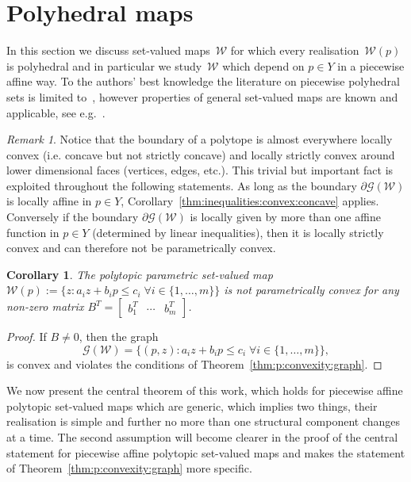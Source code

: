 \documentclass[final]{elsarticle}
\newcounter{thmcount}
\newtheorem{cor}[thmcount]{Corollary}
\theoremstyle{remark}
\newtheorem{rem}[thmcount]{Remark}
\theoremstyle{definition}
\begin{document}
\section{Polyhedral maps}\label{sec:polyhedral:maps}
%
%
%
%
In this section we discuss set-valued maps~$\mathcal W$ for which every realisation~$\mathcal W(p)$ is polyhedral and in particular we study~$\mathcal W$ which depend on $p\in Y$ in a piecewise affine way. 
%
To the authors' best knowledge the literature on piecewise polyhedral sets is limited to~\cite{Finzel:2000}, however properties of general set-valued maps are known and applicable, see e.g.~\cite{Aubin:2009}.
%
\begin{rem}
%
Notice that the boundary of a polytope is almost everywhere locally convex (i.e. concave but not strictly concave) and locally strictly convex around lower dimensional faces (vertices, edges, etc.).
%
This trivial but important fact is exploited throughout the following statements. 
%
As long as the boundary $\partial\mathscr G(\mathcal W)$ is locally affine in $p\in Y$, Corollary~\ref{thm:inequalities:convex:concave} applies. 
%
Conversely if the boundary $\partial\mathscr G(\mathcal W)$ is locally given by more than one affine function in $p\in Y$ (determined by linear inequalities), then it is locally strictly convex and can therefore not be parametrically convex.
\end{rem}
%
\begin{cor}\label{thm:polytopic:set:not:p:convex}
The polytopic parametric set-valued map $\mathcal W(p):=\{z: a_i z + b_i p\leq c_i \; \forall i\in\{1,\dots,m\}\}$
is not parametrically convex for any non-zero matrix $B^T = [\begin{matrix} b_1^T & \cdots & b_m^T\end{matrix}]$.
\end{cor}
%
\begin{proof}
If $B\neq 0$, then the graph
%
\begin{equation*}
	\mathscr G(\mathcal W) = \{(p,z):a_i z + b_i p\leq c_i \; \forall i\in\{1,\dots,m\}\} ,
\end{equation*}
%
is convex and violates the conditions of Theorem~\ref{thm:p:convexity:graph}.
\end{proof}
%
We now present the central theorem of this work, which holds for piecewise affine polytopic set-valued maps which are generic, which implies two things, their realisation is simple and further no more than one structural component changes at a time. 
%
The second assumption will become clearer in the proof of the central statement for piecewise affine polytopic set-valued maps and makes the statement of Theorem~\ref{thm:p:convexity:graph} more specific.
\end{document}
